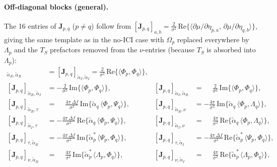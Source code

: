 \documentclass[11pt]{article}
\begin{document}
\paragraph{Off-diagonal blocks (general).} The 16 entries of
\(\bm{J}_{p,q}\) (\(p\neq q\)) follow from
\([\bm{J}_{p,q}]_{a,b} = \tfrac{2}{\sigma^2}\,\text{Re}\{\langle
\partial\mu/\partial\eta_{p,a},\,\partial\mu/\partial\eta_{q,b}\rangle\}\),
giving the same template as in the no-ICI case with \(\Omega_p\)
replaced everywhere by \(\Lambda_p\) and the \(T_S\) prefactors
removed from the \(\nu\)-entries (because \(T_S\) is absorbed into
\(\Lambda_p\)):
\begin{align}
    [\bm{J}_{p,q}]_{\tilde{\alpha}_R,\tilde{\alpha}_R} &=
        [\bm{J}_{p,q}]_{\tilde{\alpha}_I,\tilde{\alpha}_I} =
        \tfrac{2}{\sigma^2}\,\text{Re}\{\langle \Phi_p,\Phi_q\rangle\}, \\
    [\bm{J}_{p,q}]_{\tilde{\alpha}_R,\tilde{\alpha}_I} &=
        -\tfrac{2}{\sigma^2}\,\text{Im}\{\langle \Phi_p,\Phi_q\rangle\}, &
    [\bm{J}_{p,q}]_{\tilde{\alpha}_I,\tilde{\alpha}_R} &=
        \phantom{-}\tfrac{2}{\sigma^2}\,\text{Im}\{\langle \Phi_p,\Phi_q\rangle\}, \\
    [\bm{J}_{p,q}]_{\tilde{\alpha}_R,\tau} &=
        \phantom{-}\tfrac{4\pi\,\Delta f}{\sigma^2}\,
        \text{Im}\{\tilde{\alpha}_q\,\langle \Phi_p,\Psi_q\rangle\}, &
    [\bm{J}_{p,q}]_{\tilde{\alpha}_R,\nu} &=
        -\tfrac{4\pi}{\sigma^2}\,
        \text{Im}\{\tilde{\alpha}_q\,\langle \Phi_p,\Lambda_q\rangle\}, \\
    [\bm{J}_{p,q}]_{\tilde{\alpha}_I,\tau} &=
        -\tfrac{4\pi\,\Delta f}{\sigma^2}\,
        \text{Re}\{\tilde{\alpha}_q\,\langle \Phi_p,\Psi_q\rangle\}, &
    [\bm{J}_{p,q}]_{\tilde{\alpha}_I,\nu} &=
        \phantom{-}\tfrac{4\pi}{\sigma^2}\,
        \text{Re}\{\tilde{\alpha}_q\,\langle \Phi_p,\Lambda_q\rangle\}, \\
    [\bm{J}_{p,q}]_{\tau,\tilde{\alpha}_R} &=
        -\tfrac{4\pi\,\Delta f}{\sigma^2}\,
        \text{Im}\{\tilde{\alpha}_p^*\,\langle \Psi_p,\Phi_q\rangle\}, &
    [\bm{J}_{p,q}]_{\tau,\tilde{\alpha}_I} &=
        -\tfrac{4\pi\,\Delta f}{\sigma^2}\,
        \text{Re}\{\tilde{\alpha}_p^*\,\langle \Psi_p,\Phi_q\rangle\}, \\
    [\bm{J}_{p,q}]_{\nu,\tilde{\alpha}_R} &=
        \phantom{-}\tfrac{4\pi}{\sigma^2}\,
        \text{Im}\{\tilde{\alpha}_p^*\,\langle \Lambda_p,\Phi_q\rangle\}, &
    [\bm{J}_{p,q}]_{\nu,\tilde{\alpha}_I} &=
        \phantom{-}\tfrac{4\pi}{\sigma^2}\,
        \text{Re}\{\tilde{\alpha}_p^*\,\langle \Lambda_p,\Phi_q\rangle\}, \\

\end{align}
\end{document}
